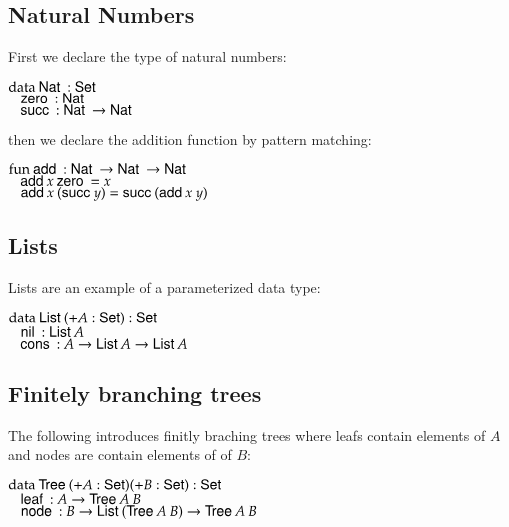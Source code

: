 \subsection{Natural Numbers}
First we declare the type of natural numbers:
\begin{bsp}
$\data \Nat : \Set$ \\
$\spc \zero : \Nat $\\
$\spc \suc : \Nat \ra \Nat$
\end{bsp}
then we declare the addition function by pattern matching:
\begin{bsp}
$\fun \add : \Nat \ra \Nat \ra \Nat$\\
$\spc \add x \: \zero = x $\\
$\spc \add x \: (\suc y) = \suc (\add x \: y)  $
\end{bsp}
\subsection{Lists}
Lists are an example of a parameterized data type:
\begin{bsp}
$\data \List ( + A : \Set ) : \Set $ \\
$ \spc \nil : \List A  $\\
$ \spc \cons : A \ra \List A \ra \List A $
\end{bsp}
\subsection{Finitely branching trees}
\label{tre}
The following introduces finitly braching trees where leafs contain elements of $A$ and nodes are contain elements of of $B$:
\begin{bsp}
$\data \Tree ( + A : \Set ) ( + B : \Set ) : \Set $ \\
$ \spc \leaf : A \ra \Tree A \: B $\\
$ \spc \node : B \ra \List (\Tree A \: B) \ra \Tree A \: B $
\end{bsp}

